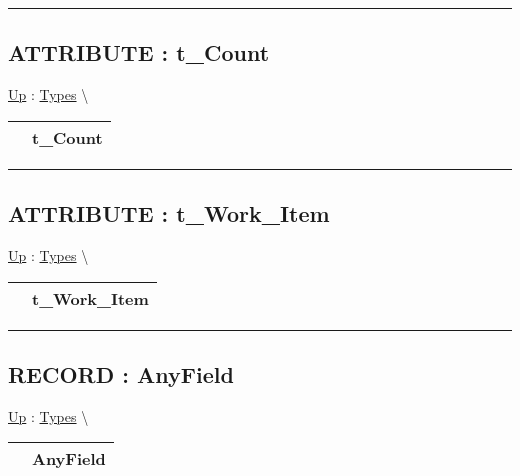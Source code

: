 \par


\rule{\linewidth}{0.5pt}
\subsection*{ATTRIBUTE : t\_Count}
\hypertarget{ecldoc:ml_core.types.t_count}{}
\hyperlink{ecldoc:ML_Core.Types}{Up} :
\hspace{0pt} \hyperlink{ecldoc:ML_Core.Types}{Types} \textbackslash 

{\renewcommand{\arraystretch}{1.5}
\begin{tabularx}{\textwidth}{|>{\raggedright\arraybackslash}l|X|}
\hline
\hspace{0pt} & t\_Count \\
\hline
\end{tabularx}
}

\par


\rule{\linewidth}{0.5pt}
\subsection*{ATTRIBUTE : t\_Work\_Item}
\hypertarget{ecldoc:ml_core.types.t_work_item}{}
\hyperlink{ecldoc:ML_Core.Types}{Up} :
\hspace{0pt} \hyperlink{ecldoc:ML_Core.Types}{Types} \textbackslash 

{\renewcommand{\arraystretch}{1.5}
\begin{tabularx}{\textwidth}{|>{\raggedright\arraybackslash}l|X|}
\hline
\hspace{0pt} & t\_Work\_Item \\
\hline
\end{tabularx}
}

\par


\rule{\linewidth}{0.5pt}
\subsection*{RECORD : AnyField}
\hypertarget{ecldoc:ml_core.types.anyfield}{}
\hyperlink{ecldoc:ML_Core.Types}{Up} :
\hspace{0pt} \hyperlink{ecldoc:ML_Core.Types}{Types} \textbackslash 

{\renewcommand{\arraystretch}{1.5}
\begin{tabularx}{\textwidth}{|>{\raggedright\arraybackslash}l|X|}
\hline
\hspace{0pt} & AnyField \\
\hline
\end{tabularx}
}

